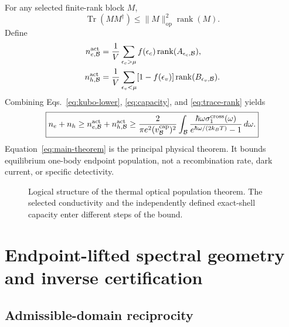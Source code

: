 \documentclass[aps,twocolumn,superscriptaddress,longbibliography]{revtex4-2}
\newcommand{\Tr}{\operatorname{Tr}}
\newcommand{\rank}{\operatorname{rank}}
\newcommand{\op}{\operatorname{op}}
\newcommand{\cB}{\mathcal B}
\begin{document}
For any selected finite-rank block $M$,
\begin{equation}
\Tr(MM^\dagger)\le \|M\|_{\op}^2\rank(M).
\label{eq:trace-rank}
\end{equation}
Define
\begin{align}
n_{e,\cB}^{\rm act}&=\frac{1}{V}\sum_{\epsilon_c>\mu}f(\epsilon_c)\rank(A_{\epsilon_c,\cB}),\\
n_{h,\cB}^{\rm act}&=\frac{1}{V}\sum_{\epsilon_v<\mu}[1-f(\epsilon_v)]\rank(B_{\epsilon_v,\cB}).
\end{align}
Combining Eqs.~\eqref{eq:kubo-lower}, \eqref{eq:capacity}, and \eqref{eq:trace-rank} yields
\begin{equation}
\boxed{
 n_e+n_h\ge n_{e,\cB}^{\rm act}+n_{h,\cB}^{\rm act}
 \ge
 \frac{2}{\pi e^2(v_{\cB}^{\rm cap})^2}
 \int_{\cB}\frac{\hbar\omega\sigma_1^{\rm cross}(\omega)}
 {e^{\hbar\omega/(2k_BT)}-1}\,d\omega .}
\label{eq:main-theorem}
\end{equation}
Equation~\eqref{eq:main-theorem} is the principal physical theorem. It bounds equilibrium one-body endpoint population, not a recombination rate, dark current, or specific detectivity.

\begin{figure}[t]
\centering
{}
\caption{Logical structure of the thermal optical population theorem. The selected conductivity and the independently defined exact-shell capacity enter different steps of the bound.}
\label{fig:theorem-flow}
\end{figure}

\section{Endpoint-lifted spectral geometry and inverse certification}

\subsection{Admissible-domain reciprocity}
\end{document}
